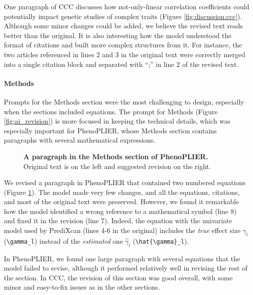 \documentclass[
]{article}
\begin{document}
One paragraph of CCC discusses how not-only-linear correlation coefficients could potentially impact genetic studies of complex traits (Figure \ref{fig:discussion:ccc}).
Although some minor changes could be added, we believe the revised text reads better than the original.
It is also interesting how the model understood the format of citations and built more complex structures from it.
For instance, the two articles referenced in lines 2 and 3 in the original text were correctly merged into a single citation block and separated with ``;'' in line 2 of the revised text.

\hypertarget{methods}{%
\paragraph{Methods}\label{methods}}

Prompts for the Methods section were the most challenging to design, especially when the sections included equations.
The prompt for Methods (Figure \ref{fig:ai_revision}) is more focused in keeping the technical details, which was especially important for PhenoPLIER, whose Methods section contains paragraphs with several mathematical expressions.

\begin{figure}
\hypertarget{fig:methods:phenoplier}{%
\centering

\caption{\textbf{A paragraph in the Methods section of PhenoPLIER.}
Original text is on the left and suggested revision on the right.}\label{fig:methods:phenoplier}
}
\end{figure}

We revised a paragraph in PhenoPLIER that contained two numbered equations (Figure \ref{fig:methods:phenoplier}).
The model made very few changes, and all the equations, citations, and most of the original text were preserved.
However, we found it remarkable how the model identified a wrong reference to a mathematical symbol (line 8) and fixed it in the revision (line 7).
Indeed, the equation with the univariate model used by PrediXcan (lines 4-6 in the original) includes the \emph{true} effect size \(\gamma_l\) (\texttt{\textbackslash{}gamma\_l}) instead of the \emph{estimated} one \(\hat{\gamma}_l\) (\texttt{\textbackslash{}hat\{\textbackslash{}gamma\}\_l}).

In PhenoPLIER, we found one large paragraph with several equations that the model failed to revise, although it performed relatively well in revising the rest of the section.
In CCC, the revision of this section was good overall, with some minor and easy-to-fix issues as in the other sections.
\end{document}
